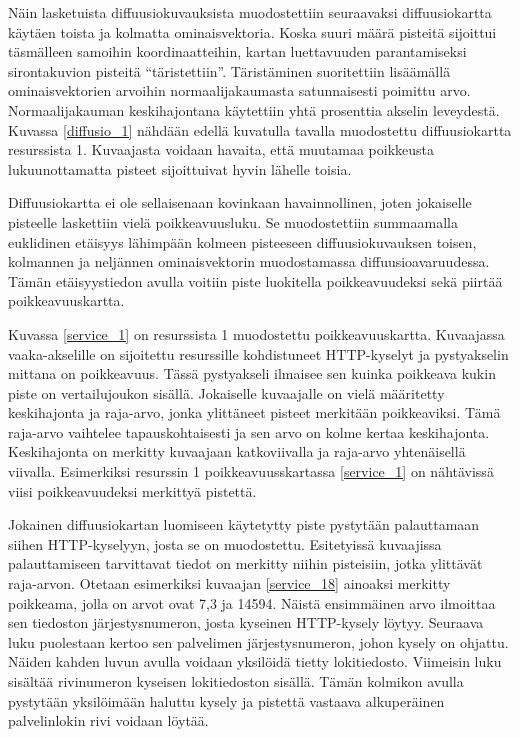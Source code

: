 Näin lasketuista diffuusiokuvauksista muodostettiin seuraavaksi
diffuusiokartta käytäen toista ja kolmatta ominaisvektoria. Koska
suuri määrä pisteitä sijoittui täsmälleen samoihin koordinaatteihin,
kartan luettavuuden parantamiseksi sirontakuvion pisteitä
``täristettiin''. Täristäminen suoritettiin lisäämällä
ominaisvektorien arvoihin normaalijakaumasta satunnaisesti poimittu
arvo. Normaalijakauman keskihajontana käytettiin yhtä prosenttia
akselin leveydestä. Kuvassa \ref{diffusio_1} nähdään edellä kuvatulla
tavalla muodostettu diffuusiokartta resurssista 1. Kuvaajasta voidaan
havaita, että muutamaa poikkeusta lukuunottamatta pisteet sijoittuivat
hyvin lähelle toisia.

Diffuusiokartta ei ole sellaisenaan kovinkaan havainnollinen, joten
jokaiselle pisteelle laskettiin vielä poikkeavuusluku. Se muodostettiin
summaamalla euklidinen etäisyys lähimpään kolmeen pisteeseen
diffuusiokuvauksen toisen, kolmannen ja neljännen ominaisvektorin
muodostamassa diffuusioavaruudessa. Tämän etäisyystiedon avulla voitiin piste
luokitella poikkeavuudeksi sekä piirtää poikkeavuuskartta.


Kuvassa \ref{service_1} on resurssista 1 muodostettu poikkeavuuskartta. Kuvaajassa vaaka-akselille on sijoitettu resurssille kohdistuneet HTTP-kyselyt
ja pystyakselin mittana on poikkeavuus. Tässä pystyakseli ilmaisee sen kuinka poikkeava kukin piste on vertailujoukon sisällä. Jokaiselle kuvaajalle
on vielä määritetty keskihajonta ja raja-arvo, jonka ylittäneet pisteet merkitään poikkeaviksi. Tämä raja-arvo vaihtelee tapauskohtaisesti ja sen
arvo on kolme kertaa keskihajonta. Keskihajonta on merkitty kuvaajaan katkoviivalla ja raja-arvo yhtenäisellä viivalla. Esimerkiksi resurssin 1 
poikkeavuusskartassa \ref{service_1} on nähtävissä viisi poikkeavuudeksi merkittyä pistettä.

Jokainen diffuusiokartan luomiseen käytetytty piste pystytään
palauttamaan siihen HTTP-kyselyyn, josta se on
muodostettu. Esitetyissä kuvaajissa palauttamiseen tarvittavat tiedot
on merkitty niihin pisteisiin, jotka ylittävät raja-arvon. Otetaan
esimerkiksi kuvaajan \ref{service_18} ainoaksi merkitty poikkeama,
jolla on arvot ovat 7,3 ja 14594. Näistä ensimmäinen arvo ilmoittaa
sen tiedoston järjestysnumeron, josta kyseinen HTTP-kysely
löytyy. Seuraava luku puolestaan kertoo sen palvelimen
järjestysnumeron, johon kysely on ohjattu. Näiden kahden luvun avulla
voidaan yksilöidä tietty lokitiedosto. Viimeisin luku sisältää
rivinumeron kyseisen lokitiedoston sisällä.  Tämän kolmikon avulla
pystytään yksilöimään haluttu kysely ja pistettä vastaava alkuperäinen
palvelinlokin rivi voidaan löytää.

